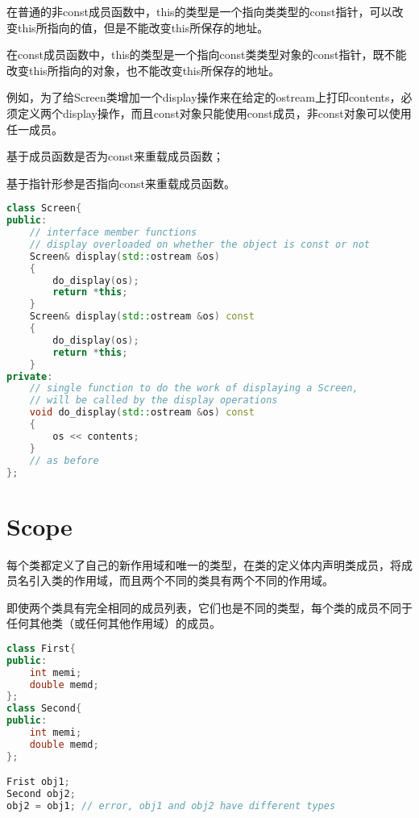 \begin{compactitem}
\item 在普通的非const成员函数中，this的类型是一个指向类类型的const指针，可以改变this所指向的值，但是不能改变this所保存的地址。
\item 在const成员函数中，this的类型是一个指向const类类型对象的const指针，既不能改变this所指向的对象，也不能改变this所保存的地址。
\end{compactitem}

例如，为了给Screen类增加一个display操作来在给定的ostream上打印contents，必须定义两个display操作，而且const对象只能使用const成员，非const对象可以使用任一成员。

\begin{compactitem}
\item 基于成员函数是否为const来重载成员函数；
\item 基于指针形参是否指向const来重载成员函数。
\end{compactitem}



\begin{lstlisting}[language=C++]
class Screen{
public:
	// interface member functions
	// display overloaded on whether the object is const or not
	Screen& display(std::ostream &os)
	{
		do_display(os);
		return *this;
	}
	Screen& display(std::ostream &os) const
	{
		do_display(os);
		return *this;
	}
private:
	// single function to do the work of displaying a Screen,
	// will be called by the display operations
	void do_display(std::ostream &os) const
	{
		os << contents;
	}
	// as before
};
\end{lstlisting}

\section{Scope}

每个类都定义了自己的新作用域和唯一的类型，在类的定义体内声明类成员，将成员名引入类的作用域，而且两个不同的类具有两个不同的作用域。

即使两个类具有完全相同的成员列表，它们也是不同的类型，每个类的成员不同于任何其他类（或任何其他作用域）的成员。


\begin{lstlisting}[language=C++]
class First{
public:
	int memi;
	double memd;
};
class Second{
public:
	int memi;
	double memd;
};

Frist obj1;
Second obj2;
obj2 = obj1; // error, obj1 and obj2 have different types
\end{lstlisting}

